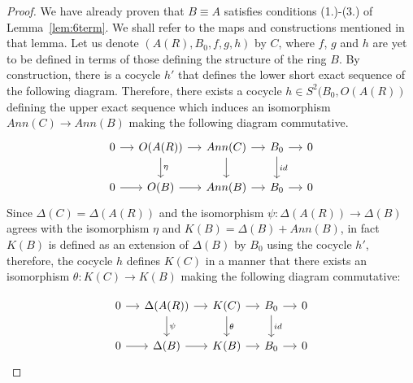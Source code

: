 \documentclass[10pt,a4paper]{amsart}
\begin{document}
\begin{proof}
    We have already proven that $B\equiv A$ satisfies conditions (1.)-(3.) of  Lemma~\ref{lem:6term}. We shall refer to the maps and constructions mentioned in that lemma. Let us denote $(A(R),B_0,f,g,h)$ by $C$, where $f$, $g$ and $h$ are yet to be defined in terms of those defining the structure of the ring $B$. By construction, there is a cocycle $h'$ that defines the lower short exact sequence of the following diagram. Therefore, there exists a cocycle $h\in S^2(B_0, O(A(R))$ defining the upper exact sequence which induces an isomorphism $Ann(C)\to Ann(B)$ making the following diagram commutative.
$$\begin{tikzcd}[column sep=small]
0 \arrow[r] & O(A(R)) \arrow[r]  \arrow[d,"\eta"] &
Ann(C) \arrow[r] \arrow[d]&
B_0 \arrow[r]\arrow[d,"id"] &0\\
0 \arrow[r] & O(B) \arrow[r] &
Ann(B) \arrow[r]  &
B_0 \arrow[r]  & 0
\end{tikzcd}$$
Since $\Delta(C)=\Delta(A(R))$ and the isomorphism $\psi: \Delta(A(R))\to \Delta(B)$ agrees with the isomorphism $\eta$ and $K(B)=\Delta(B)+Ann(B)$, in fact $K(B)$ is defined as an extension of $\Delta(B)$ by $B_0$ using the cocycle $h'$, therefore, the cocycle $h$ defines $K(C)$ in a manner that there exists an isomorphism $\theta:K(C) \to K(B)$ making the following diagram commutative:

$$\begin{tikzcd}[column sep=small]
0 \arrow[r] & \Delta(A(R)) \arrow[r]  \arrow[d,"\psi"] &
K(C) \arrow[r] \arrow[d, "\theta"]&
B_0 \arrow[r]\arrow[d,"id"] &0\\
0 \arrow[r] & \Delta(B) \arrow[r] &
K(B) \arrow[r]  &
B_0 \arrow[r]  & 0
\end{tikzcd}$$


\end{proof}
\end{document}
